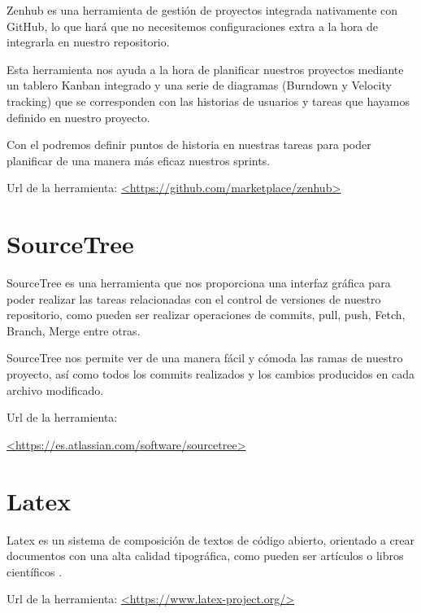 Zenhub es una herramienta de gestión de proyectos integrada nativamente con GitHub, lo que hará que no necesitemos configuraciones extra a la hora de integrarla en nuestro repositorio. 

Esta herramienta nos ayuda a la hora de planificar nuestros proyectos mediante un tablero Kanban integrado y una serie de diagramas (Burndown y Velocity tracking) que se corresponden con las historias de usuarios y tareas que hayamos definido en nuestro proyecto.

Con el podremos definir puntos de historia en nuestras tareas para poder planificar de una manera más eficaz nuestros sprints.

Url de la herramienta: \url{<https://github.com/marketplace/zenhub>}

\section{SourceTree}

SourceTree es una herramienta que nos proporciona una interfaz gráfica para poder realizar las tareas relacionadas con el control de versiones de nuestro repositorio, como pueden ser realizar  operaciones de commits, pull, push, Fetch, Branch, Merge entre otras.

SourceTree nos permite ver de una manera fácil y cómoda las ramas de nuestro proyecto, así como todos los commits realizados y los cambios producidos en cada archivo modificado.

Url de la herramienta: 

\url{<https://es.atlassian.com/software/sourcetree>}

\section{Latex}

Latex es un sistema de composición de textos de código abierto, orientado a crear documentos con una alta calidad tipográfica, como pueden ser artículos o libros científicos \cite{wiki:Latex}.

Url de la herramienta: \url{<https://www.latex-project.org/>}



